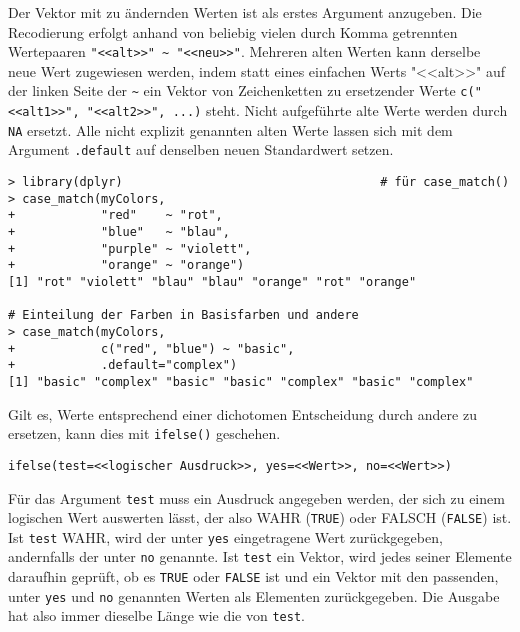 Der Vektor mit zu ändernden Werten ist als erstes Argument anzugeben. Die Recodierung erfolgt anhand von beliebig vielen durch Komma getrennten Wertepaaren \lstinline!"<<alt>>" ~ "<<neu>>"!. Mehreren alten Werten kann derselbe neue Wert zugewiesen werden, indem statt eines einfachen Werts "<<alt>>" auf der linken Seite der \lstinline!~! ein Vektor von Zeichenketten zu ersetzender Werte \lstinline!c("<<alt1>>", "<<alt2>>", ...)! steht. Nicht aufgeführte alte Werte werden durch \lstinline!NA! ersetzt. Alle nicht explizit genannten alten Werte lassen sich mit dem Argument \lstinline!.default! auf denselben neuen Standardwert setzen.
\begin{lstlisting}
> library(dplyr)                                    # für case_match()
> case_match(myColors,
+            "red"    ~ "rot",
+            "blue"   ~ "blau",
+            "purple" ~ "violett",
+            "orange" ~ "orange")
[1] "rot" "violett" "blau" "blau" "orange" "rot" "orange" 

# Einteilung der Farben in Basisfarben und andere
> case_match(myColors,
+            c("red", "blue") ~ "basic",
+            .default="complex")
[1] "basic" "complex" "basic" "basic" "complex" "basic" "complex"
\end{lstlisting}

Gilt es, Werte entsprechend einer dichotomen Entscheidung durch andere zu ersetzen, kann dies mit \lstinline!ifelse()! geschehen.
\begin{lstlisting}
ifelse(test=<<logischer Ausdruck>>, yes=<<Wert>>, no=<<Wert>>)
\end{lstlisting}

Für das Argument \lstinline!test! muss ein Ausdruck angegeben werden, der sich zu einem logischen Wert auswerten lässt, der also WAHR (\lstinline!TRUE!) oder FALSCH (\lstinline!FALSE!) ist. Ist \lstinline!test! WAHR, wird der unter \lstinline!yes! eingetragene Wert zurückgegeben, andernfalls der unter \lstinline!no! genannte. Ist \lstinline!test! ein Vektor, wird jedes seiner Elemente daraufhin geprüft, ob es \lstinline!TRUE! oder \lstinline!FALSE! ist und ein Vektor mit den passenden, unter \lstinline!yes! und \lstinline!no! genannten Werten als Elementen zurückgegeben. Die Ausgabe hat also immer dieselbe Länge wie die von \lstinline!test!.

